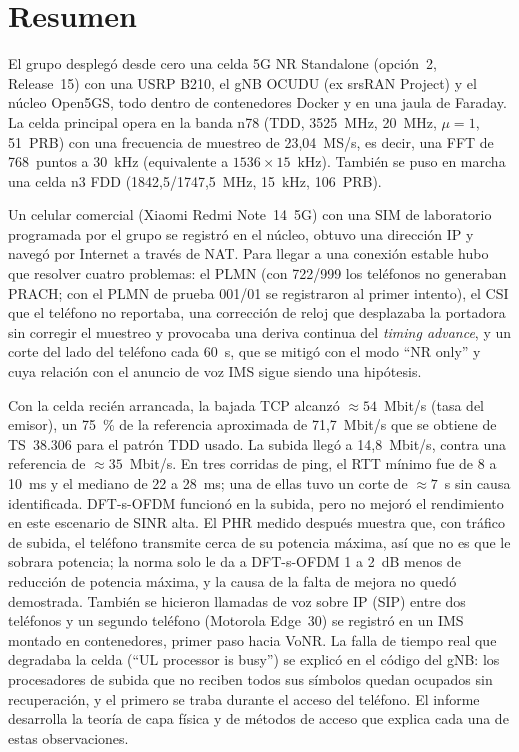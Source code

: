 \section*{Resumen}
El grupo desplegó desde cero una celda 5G NR Standalone (opción~2, Release~15) con una USRP B210, el gNB OCUDU (ex srsRAN Project) y el núcleo Open5GS, todo dentro de contenedores Docker y en una jaula de Faraday. La celda principal opera en la banda n78 (TDD, 3525~MHz, 20~MHz, $\mu=1$, 51~PRB) con una frecuencia de muestreo de 23,04~MS/s, es decir, una FFT de 768~puntos a 30~kHz (equivalente a $1536\times 15$~kHz). También se puso en marcha una celda n3 FDD (1842,5/1747,5~MHz, 15~kHz, 106~PRB).

Un celular comercial (Xiaomi Redmi Note~14~5G) con una SIM de laboratorio programada por el grupo se registró en el núcleo, obtuvo una dirección IP y navegó por Internet a través de NAT. Para llegar a una conexión estable hubo que resolver cuatro problemas: el PLMN (con 722/999 los teléfonos no generaban PRACH; con el PLMN de prueba 001/01 se registraron al primer intento), el CSI que el teléfono no reportaba, una corrección de reloj que desplazaba la portadora sin corregir el muestreo y provocaba una deriva continua del \emph{timing advance}, y un corte del lado del teléfono cada 60~s, que se mitigó con el modo ``NR only'' y cuya relación con el anuncio de voz IMS sigue siendo una hipótesis.

Con la celda recién arrancada, la bajada TCP alcanzó $\approx 54$~Mbit/s (tasa del emisor), un 75~\% de la referencia aproximada de 71,7~Mbit/s que se obtiene de TS~38.306 para el patrón TDD usado. La subida llegó a 14,8~Mbit/s, contra una referencia de $\approx 35$~Mbit/s. En tres corridas de ping, el RTT mínimo fue de 8 a 10~ms y el mediano de 22 a 28~ms; una de ellas tuvo un corte de $\approx 7$~s sin causa identificada. DFT-s-OFDM funcionó en la subida, pero no mejoró el rendimiento en este escenario de SINR alta. El PHR medido después muestra que, con tráfico de subida, el teléfono transmite cerca de su potencia máxima, así que no es que le sobrara potencia; la norma solo le da a DFT-s-OFDM 1 a 2~dB menos de reducción de potencia máxima, y la causa de la falta de mejora no quedó demostrada. También se hicieron llamadas de voz sobre IP (SIP) entre dos teléfonos y un segundo teléfono (Motorola Edge~30) se registró en un IMS montado en contenedores, primer paso hacia VoNR. La falla de tiempo real que degradaba la celda (``UL processor is busy'') se explicó en el código del gNB: los procesadores de subida que no reciben todos sus símbolos quedan ocupados sin recuperación, y el primero se traba durante el acceso del teléfono. El informe desarrolla la teoría de capa física y de métodos de acceso que explica cada una de estas observaciones.
